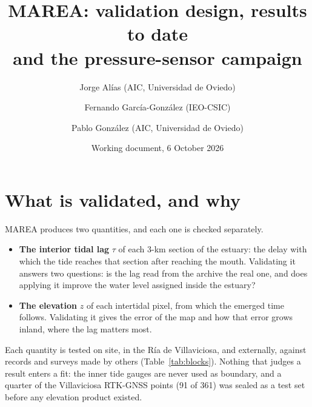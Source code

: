 \documentclass[11pt,a4paper]{article}
\title{MAREA: validation design, results to date\\and the pressure-sensor campaign}
\author{Jorge Al\'ias (AIC, Universidad de Oviedo) \and Fernando Garc\'ia-Gonz\'alez (IEO-CSIC) \and Pablo Gonz\'alez (AIC, Universidad de Oviedo)}
\date{Working document, 6 October 2026}
\begin{document}
\maketitle

\section{What is validated, and why}

MAREA produces two quantities, and each one is checked separately.
\begin{itemize}
\item \textbf{The interior tidal lag} $\tau$ of each 3-km section of the
  estuary: the delay with which the tide reaches that section after
  reaching the mouth. Validating it answers two questions: is the lag
  read from the archive the real one, and does applying it improve the
  water level assigned inside the estuary?
\item \textbf{The elevation} $z$ of each intertidal pixel, from which the
  emerged time follows. Validating it gives the error of the map and how
  that error grows inland, where the lag matters most.
\end{itemize}
Each quantity is tested on site, in the R\'ia de Villaviciosa, and
externally, against records and surveys made by others
(Table~\ref{tab:blocks}). Nothing that judges a result enters a fit: the
inner tide gauges are never used as boundary, and a quarter of the
Villaviciosa RTK-GNSS points (91 of 361) was sealed as a test set before
any elevation product existed.

\begin{table}[H]
\centering
\caption{The validation blocks.}
\label{tab:blocks}
\small
\setlength{\tabcolsep}{4pt}
\end{table}
\end{document}
